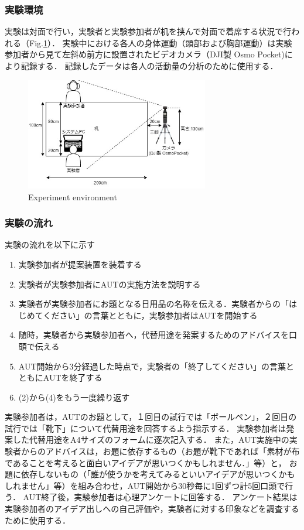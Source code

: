\documentclass[a4paper]{jarticle}
\begin{document}
\subsubsection{実験環境}
実験は対面で行い，実験者と実験参加者が机を挟んで対面で着席する状況で行われる（Fig.\ref{fig:env}）．
実験中における各人の身体運動（頭部および胸部運動）は実験参加者から見て左斜め前方に設置されたビデオカメラ（DJI製 Osmo Pocket)により記録する．
記録したデータは各人の活動量の分析のために使用する．

\begin{figure}[htbp]
    \begin{center}
    \includegraphics[width=80mm]{configuration.jpg}
    \caption{Experiment environment}
    \label{fig:env}
    \end{center}
    \end{figure}
\subsubsection{実験の流れ}
実験の流れを以下に示す
\begin{enumerate}
    \item 実験参加者が提案装置を装着する
    \item 実験者が実験参加者にAUTの実施方法を説明する
    \item 実験者が実験参加者にお題となる日用品の名称を伝える．実験者からの「はじめてください」の言葉とともに，実験参加者はAUTを開始する
    \item 随時，実験者から実験参加者へ，代替用途を発案するためのアドバイスを口頭で伝える
    \item AUT開始から3分経過した時点で，実験者の「終了してください」の言葉とともにAUTを終了する
    \item (2)から(4)をもう一度繰り返す
\end{enumerate}

実験参加者は，AUTのお題として，１回目の試行では「ボールペン」，２回目の試行では「靴下」について代替用途を回答するよう指示する．
実験参加者は発案した代替用途をA4サイズのフォームに逐次記入する．
また，AUT実施中の実験者からのアドバイスは，お題に依存するもの（お題が靴下であれば「素材が布であることを考えると面白いアイデアが思いつくかもしれません．」等）と，
お題に依存しないもの（「誰が使うかを考えてみるといいアイデアが思いつくかもしれません」等）を組み合わせ，AUT開始から30秒毎に1回ずつ計5回口頭で行う．
AUT終了後，実験参加者は心理アンケートに回答する．
アンケート結果は実験参加者のアイデア出しへの自己評価や，実験者に対する印象などを調査するために使用する．
\end{document}
